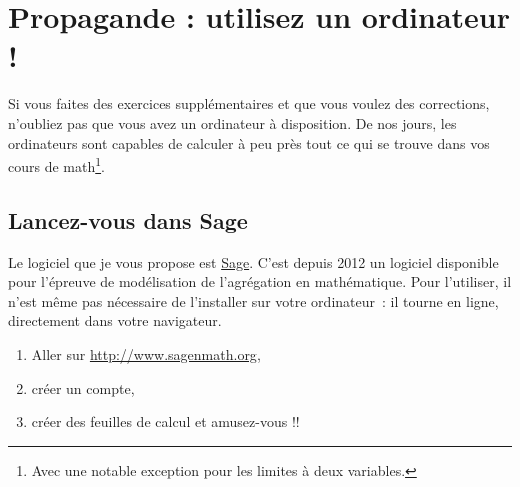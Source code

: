 \section{Propagande : utilisez un ordinateur !}

Si vous faites des exercices supplémentaires et que vous voulez des corrections, n'oubliez pas que vous avez un ordinateur à disposition. De nos jours, les ordinateurs sont capables de calculer à peu près tout ce qui se trouve dans vos cours de math\footnote{Avec une notable exception pour les limites à deux variables.}.


\subsection{Lancez-vous dans Sage}

Le logiciel que je vous propose est \href{http://www.sagemath.org}{Sage}. C'est depuis 2012 un logiciel disponible pour l'épreuve de modélisation de l'agrégation en mathématique. Pour l'utiliser, il n'est même pas nécessaire de l'installer sur votre ordinateur~: il tourne en ligne, directement dans votre navigateur.

\begin{enumerate}

	\item
        Aller sur \url{http://www.sagenmath.org},
	\item
		créer un compte,
	\item
		créer des feuilles de calcul et amusez-vous !!

\end{enumerate}

